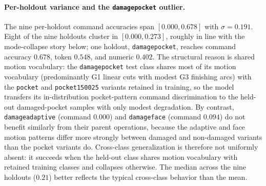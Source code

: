 \documentclass[sensors,article,submit,moreauthors,pdftex]{Definitions/mdpi}
\begin{document}
\paragraph{Per-holdout variance and the \texttt{damagepocket} outlier.} The nine per-holdout command accuracies span $[0.000, 0.678]$ with $\sigma = 0.191$. Eight of the nine holdouts cluster in $[0.000, 0.273]$, roughly in line with the mode-collapse story below; one holdout, \texttt{damagepocket}, reaches command accuracy $0.678$, token $0.548$, and numeric $0.402$. The structural reason is shared motion vocabulary: the \texttt{damagepocket} test class shares most of its motion vocabulary (predominantly G1 linear cuts with modest G3 finishing arcs) with the \texttt{pocket} and \texttt{pocket150025} variants retained in training, so the model transfers its in-distribution pocket-pattern command discrimination to the held-out damaged-pocket samples with only modest degradation. By contrast, \texttt{damageadaptive} (command $0.000$) and \texttt{damageface} (command $0.094$) do not benefit similarly from their parent operations, because the adaptive and face motion patterns differ more strongly between damaged and non-damaged variants than the pocket variants do. Cross-class generalization is therefore not uniformly absent: it succeeds when the held-out class shares motion vocabulary with retained training classes and collapses otherwise. The median across the nine holdouts ($0.21$) better reflects the typical cross-class behavior than the mean.
\end{document}
